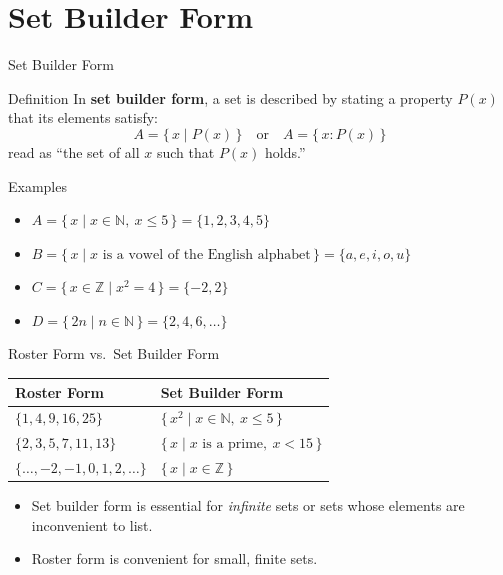 \documentclass{beamer}
\begin{document}
\section{Set Builder Form}
\begin{frame}{Set Builder Form}
  \begin{block}{Definition}
    In \textbf{set builder form}, a set is described by stating a
    property $P(x)$ that its elements satisfy:
    \[
      A = \{\, x \mid P(x) \,\} \quad \text{or} \quad
      A = \{\, x : P(x) \,\}
    \]
    read as ``the set of all $x$ such that $P(x)$ holds.''
  \end{block}
  \pause
  \begin{exampleblock}{Examples}
    \begin{itemize}
      \item $A = \{\, x \mid x \in \mathbb{N},\ x \le 5 \,\}
            = \{1,2,3,4,5\}$
      \item $B = \{\, x \mid x \text{ is a vowel of the English alphabet}\,\}
            = \{a,e,i,o,u\}$
      \item $C = \{\, x \in \mathbb{Z} \mid x^2 = 4 \,\} = \{-2, 2\}$
      \item $D = \{\, 2n \mid n \in \mathbb{N} \,\} = \{2,4,6,\dots\}$
    \end{itemize}
  \end{exampleblock}
\end{frame}

\begin{frame}{Roster Form vs.\ Set Builder Form}
  \begin{center}
    \begin{tabular}{p{4.2cm} p{5.6cm}}
      \hline
      \textbf{Roster Form} & \textbf{Set Builder Form} \\ \hline
      $\{1, 4, 9, 16, 25\}$ &
        $\{\, x^2 \mid x \in \mathbb{N},\ x \le 5 \,\}$ \\[4pt]
      $\{2, 3, 5, 7, 11, 13\}$ &
        $\{\, x \mid x \text{ is a prime},\ x < 15 \,\}$ \\[4pt]
      $\{\dots,-2,-1,0,1,2,\dots\}$ &
        $\{\, x \mid x \in \mathbb{Z} \,\}$ \\ \hline
    \end{tabular}
  \end{center}
  \pause
  \begin{itemize}
    \item Set builder form is essential for \emph{infinite} sets or sets
          whose elements are inconvenient to list.
    \item Roster form is convenient for small, finite sets.
  \end{itemize}
\end{frame}
\end{document}
